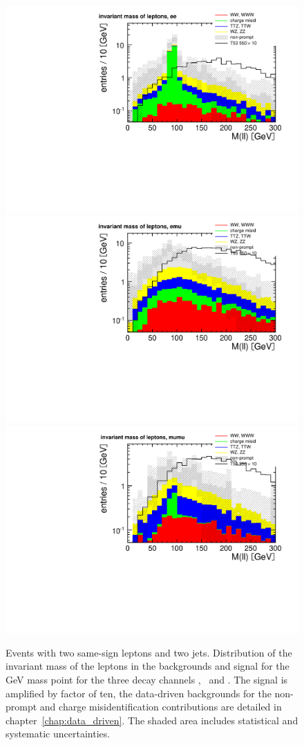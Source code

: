 \begin{figure}[htb]
    \centering
    \includegraphics[width=.7\textwidth]{images/pdf/same-sign,_2_jets/lep_mass_ee_0}
    \includegraphics[width=.7\textwidth]{images/pdf/same-sign,_2_jets/lep_mass_emu_0}
    \includegraphics[width=.7\textwidth]{images/pdf/same-sign,_2_jets/lep_mass_mumu_0}
    \caption{Events with two same-sign leptons and two jets. Distribution of the invariant mass of the leptons in the backgrounds and
        signal for the \unit[550]{GeV} mass point for the three
        decay channels \E\E, \E\M\ and \M\M. The signal is
    amplified by factor of ten, the data-driven backgrounds for the
non-prompt and charge misidentification contributions are detailed in
chapter~\ref{chap:data_driven}. The shaded area includes statistical and
systematic uncertainties.}
    \label{fig:lep_mass_app}
\end{figure}

